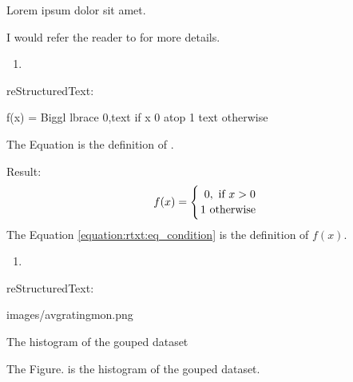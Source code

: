 \documentclass[letterpaper,11pt,english]{sphinxmanual}
\begin{document}
Lorem ipsum  dolor sit amet.

I would refer the reader to  for more details.
\begin{enumerate}
\def\theenumi{\arabic{enumi}}
\def\labelenumi{\theenumi .}
\makeatletter\def\p@enumii{\p@enumi \theenumi .}\makeatother
\setcounter{enumi}{1}
\item {} 

\end{enumerate}

reStructuredText:

\begin{sphinxVerbatim}[commandchars=\\\{\}]
 
    

        f(x)
        =
        \PYGZbs{}Biggl \PYGZbs{}lbrace
        \PYGZob{}
        0,\PYGZbs{}text\PYGZob{} if \PYGZcb{}
           \PYGZob{} x \PYGZgt{}0\PYGZcb{}
        \PYGZbs{}atop
        1 \PYGZbs{}text\PYGZob{} otherwise \PYGZcb{}
        \PYGZcb{}

The Equation  is the definition of .
\end{sphinxVerbatim}

Result:
\begin{equation}\label{equation:rtxt:eq_condition}
\begin{split}     f(x)
     =
     \Biggl \lbrace
     {
     0,\text{ if }
        { x >0}
     \atop
     1 \text{ otherwise }
     }\end{split}
\end{equation}
The Equation \eqref{equation:rtxt:eq_condition} is the definition of \(f(x)\).
\begin{enumerate}
\def\theenumi{\arabic{enumi}}
\def\labelenumi{\theenumi .}
\makeatletter\def\p@enumii{\p@enumi \theenumi .}\makeatother
\setcounter{enumi}{3}
\item {} 

\end{enumerate}

reStructuredText:

\begin{sphinxVerbatim}[commandchars=\\\{\}]
 
  images/avg\PYGZus{}rating\PYGZus{}mon.png
    
    

   The histogram of the gouped dataset

The Figure.  is the histogram of the gouped dataset.
\end{sphinxVerbatim}
\end{document}
